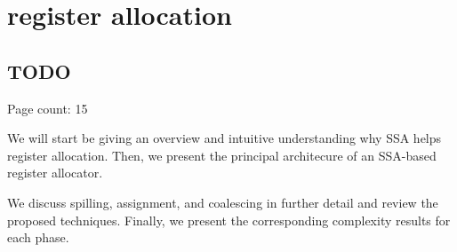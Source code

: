 \applynumberofpages\chapter{register allocation }
\section{TODO}


Page count: 15

We will start be giving an overview and intuitive understanding why SSA helps register allocation.
Then, we present the principal architecure of an SSA-based register allocator.

We discuss spilling, assignment, and coalescing in further detail and review the proposed techniques.
Finally, we present the corresponding complexity results for each phase.

